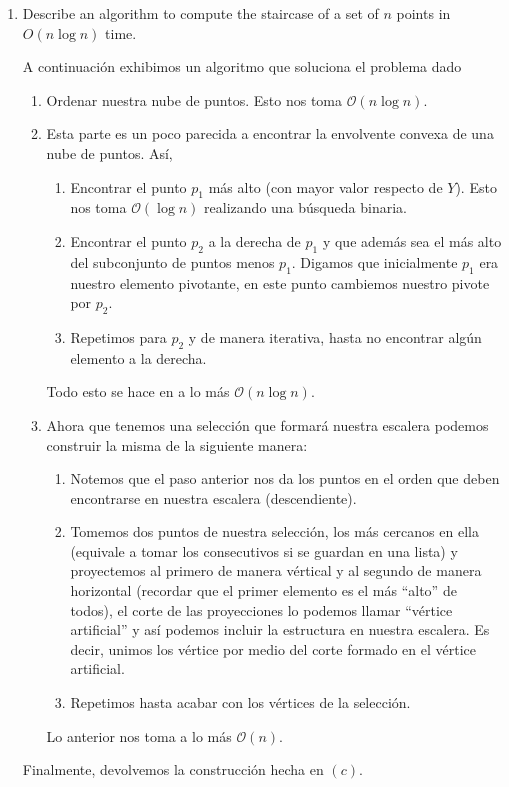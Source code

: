 \begin{enumerate}
\item Describe an algorithm to compute the staircase of a set of $n$ points in $O(n \log n)$ time.
      \newline
      
      A continuación exhibimos un algoritmo que soluciona el problema dado
      \begin{enumerate}
      \item Ordenar nuestra nube de puntos. Esto nos toma $\mathcal{O}(n \log n)$.
      \item Esta parte es un poco parecida a encontrar la envolvente convexa de una
            nube de puntos. Así,
           \begin{enumerate}
           \item Encontrar el punto $p_1$ más alto (con mayor valor respecto de $Y$). Esto nos toma $\mathcal{O}(\log n)$
                 realizando una búsqueda binaria.
           \item Encontrar el punto $p_2$ a la derecha de $p_1$ y que además sea el más alto del subconjunto de puntos
           menos $p_1$. Digamos que inicialmente $p_1$ era nuestro elemento pivotante, en este punto cambiemos nuestro
           pivote por $p_2$.
           \item Repetimos para $p_2$ y de manera iterativa, hasta no encontrar algún elemento a la derecha. 
           \end{enumerate}
           Todo esto se hace en a lo más $\mathcal{O}(n \log n)$.
      \item Ahora que tenemos una selección que formará nuestra escalera podemos construir la misma de la siguiente manera:
            \begin{enumerate}
            \item Notemos que el paso anterior nos da los puntos en el orden que deben encontrarse en nuestra escalera (descendiente).
            \item Tomemos dos puntos de nuestra selección, los más cercanos en ella (equivale a tomar los consecutivos si se guardan
            en una lista) y proyectemos al primero de manera vértical y al segundo de manera horizontal (recordar que el primer
            elemento es el más ``alto'' de todos), el corte de las proyecciones lo podemos llamar ``vértice artificial'' y así
            podemos incluir la estructura en nuestra escalera. Es decir, unimos los vértice por medio del corte formado en
            el vértice artificial.
            \item Repetimos hasta acabar con los vértices de la selección.
            \end{enumerate}
            Lo anterior nos toma a lo más $\mathcal{O}(n)$.
      \end{enumerate}
      Finalmente, devolvemos la construcción hecha en $(c)$.\newline


\end{enumerate}
